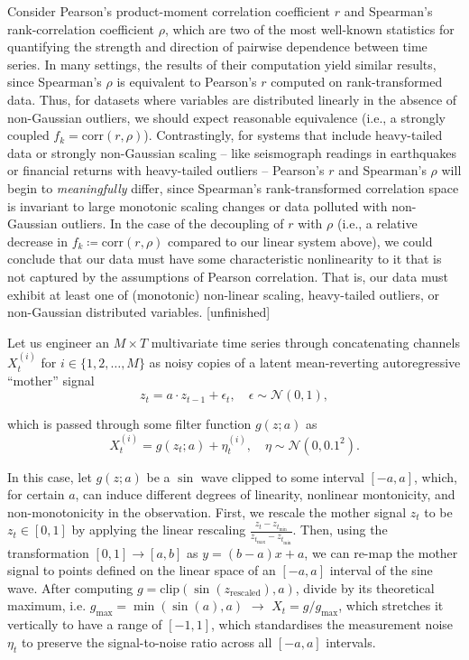 \documentclass{article}
\theoremstyle{plain}
\theoremstyle{definition}
\theoremstyle{remark}
\begin{document}
Consider Pearson’s product-moment correlation coefficient $r$ and Spearman's rank-correlation coefficient $\rho$, which are two of the most well-known statistics for quantifying the strength and direction of pairwise dependence between time series. In many settings, the results of their computation yield similar results, since Spearman's $\rho$ is equivalent to Pearson’s $r$ computed on rank-transformed data. Thus, for datasets where variables are distributed linearly in the absence of non-Gaussian outliers, we should expect reasonable equivalence (i.e., a strongly coupled $f_k = \mathrm{corr}(r, \rho)$). Contrastingly, for systems that include heavy-tailed data or strongly non-Gaussian scaling -- like seismograph readings in earthquakes or financial returns with heavy-tailed outliers -- Pearson’s $r$ and Spearman’s $\rho$ will begin to \textit{meaningfully} differ, since Spearman’s rank-transformed correlation space is invariant to large monotonic scaling changes or data polluted with non-Gaussian outliers. In the case of the decoupling of $r$ with $\rho$ (i.e., a relative decrease in $f_k \coloneqq \mathrm{corr}(r, \rho)$ compared to our linear system above), we could conclude that our data must have some characteristic nonlinearity to it that is not captured by the assumptions of Pearson correlation. That is, our data must exhibit at least one of (monotonic) non-linear scaling, heavy-tailed outliers, or non-Gaussian distributed variables. [unfinished]

Let us engineer an $M \times T$ multivariate time series through concatenating channels $X_t^{(i)}$ for $i \in \{1,2,\dots,M\}$ as noisy copies of a latent mean-reverting autoregressive “mother” signal
\begin{equation*}
   z_t = a \cdot z_{t-1} + \epsilon_t, \quad \epsilon \sim \mathcal{N}(0,1),
\end{equation*} 

which is passed through some filter function $g(z;a)$ as
\begin{equation*}
    X_t^{(i)} = g(z_t;a) + \eta_t^{(i)}, \quad \eta \sim \mathcal{N}(0,0.1^2).
\end{equation*} 

In this case, let $g(z;a)$ be a $\sin$ wave clipped to some interval $[-a,a]$, which, for certain $a$, can induce different degrees of linearity, nonlinear montonicity, and non-monotonicity in the observation. First, we rescale the mother signal $z_t$ to be $z_t \in [0,1]$ by applying the linear rescaling $\frac{z_t - z_{t_{\min}}}{z_{t_{\max}} - z_{t_{\min}}}$. Then, using the transformation $[0,1] \to [a,b]$ as $y = (b-a)x + a$, we can re-map the mother signal to points defined on the linear space of an $[-a,a]$ interval of the sine wave. After computing $g = \mathrm{clip}(\sin(z_{\mathrm{rescaled}}), a)$, divide by its theoretical maximum, i.e. $g_{\max} = \min(\sin(a), a)$ $\to$ $X_t = g/g_{\max}$, which stretches it vertically to have a range of $[-1,1]$, which standardises the measurement noise $\eta_t$ to preserve the signal-to-noise ratio across all $[-a,a]$ intervals.
\end{document}
